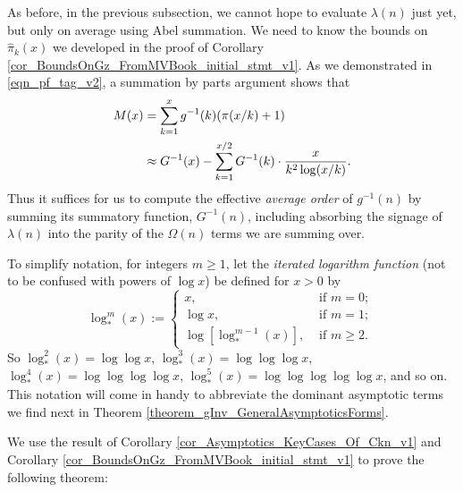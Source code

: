 \documentclass[11pt,reqno,a4letter]{article}
\numberwithin{figure}{section}
\numberwithin{table}{section}
\theoremstyle{plain}
\numberwithin{theorem}{section}
\theoremstyle{definition}
\begin{document}
As before, in the previous subsection, we cannot hope to evaluate $\lambda(n)$ just yet, but only on 
average using Abel summation. We need to know the bounds on $\widehat{\pi}_k(x)$ we developed in the 
proof of Corollary \ref{cor_BoundsOnGz_FromMVBook_initial_stmt_v1}. 
As we demonstrated in \eqref{eqn_pf_tag_v2}, a summation by parts argument shows that 
\begin{align} 
\notag
M(x) & = \sum_{k=1}^{x} g^{-1}(k) (\pi(x/k)+1) \\ 
\label{eqn_pf_tag_v2-restated_v2} 
     & \approx G^{-1}(x) - \sum_{k=1}^{x/2} G^{-1}(k) \cdot \frac{x}{k^2 \log(x/k)}. 
\end{align} 
Thus it suffices for us to compute the effective \emph{average order} of $g^{-1}(n)$ 
by summing its summatory function, $G^{-1}(n)$, including absorbing the signage of 
$\lambda(n)$ into the parity of the $\Omega(n)$ terms we are summing over. 

To simplify notation, for integers $m \geq 1$, let the \emph{iterated logarithm function} 
(not to be confused with powers of $\log x$) be defined for $x > 0$ by 
\[
\log_{\ast}^{m}(x) := \begin{cases} 
     x, & \text{ if $m = 0$; } \\ 
     \log x, & \text{ if $m = 1$; } \\ 
     \log\left[\log_{\ast}^{m-1}(x)\right], & \text{ if $m \geq 2$. } 
     \end{cases}
\]
So $\log_{\ast}^2(x) = \log\log x$, $\log_{\ast}^3(x) = \log\log\log x$, 
$\log_{\ast}^4(x) = \log\log\log\log x$, $\log_{\ast}^5(x) = \log\log\log\log\log x$, and so on. 
This notation will come in handy to abbreviate the dominant asymptotic terms we find next in 
Theorem \ref{theorem_gInv_GeneralAsymptoticsForms}. 

We use the result of 
Corollary \ref{cor_Asymptotics_KeyCases_Of_Ckn_v1} and 
Corollary \ref{cor_BoundsOnGz_FromMVBook_initial_stmt_v1} 
to prove the following theorem: 
\end{document}
